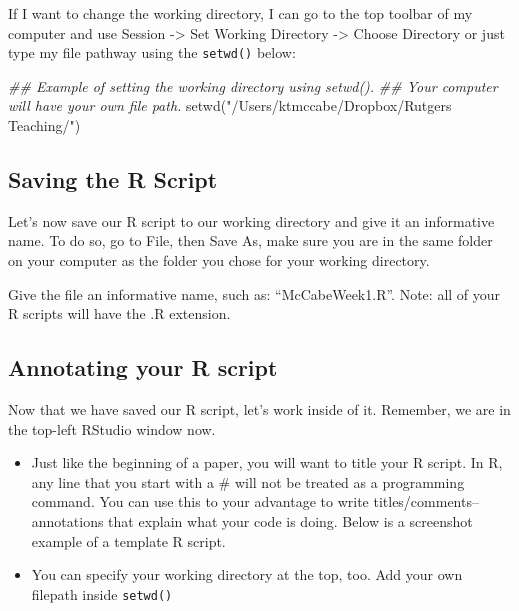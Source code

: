 \documentclass[
  letterpaper,
  DIV=11,
  numbers=noendperiod]{scrreprt}
\newenvironment{Shaded}{\begin{snugshade}}{\end{snugshade}}
\newcommand{\DocumentationTok}[1]{\textcolor[rgb]{0.37,0.37,0.37}{\textit{#1}}}
\newcommand{\FunctionTok}[1]{\textcolor[rgb]{0.28,0.35,0.67}{#1}}
\newcommand{\NormalTok}[1]{\textcolor[rgb]{0.00,0.23,0.31}{#1}}
\newcommand{\StringTok}[1]{\textcolor[rgb]{0.13,0.47,0.30}{#1}}
\providecommand{\tightlist}{%
  \setlength{\itemsep}{0pt}\setlength{\parskip}{0pt}}\usepackage{longtable,booktabs,array}
\begin{document}
If I want to change the working directory, I can go to the top toolbar
of my computer and use Session -\textgreater{} Set Working Directory
-\textgreater{} Choose Directory or just type my file pathway using the
\texttt{setwd()} below:

\begin{Shaded}
\begin{Highlighting}[]
\DocumentationTok{\#\# Example of setting the working directory using setwd().}
\DocumentationTok{\#\# Your computer will have your own file path.}
\FunctionTok{setwd}\NormalTok{(}\StringTok{"/Users/ktmccabe/Dropbox/Rutgers Teaching/"}\NormalTok{)}
\end{Highlighting}
\end{Shaded}

\hypertarget{saving-the-r-script}{%
\subsection{Saving the R Script}\label{saving-the-r-script}}

Let's now save our R script to our working directory and give it an
informative name. To do so, go to File, then Save As, make sure you are
in the same folder on your computer as the folder you chose for your
working directory.

Give the file an informative name, such as: ``McCabeWeek1.R''. Note: all
of your R scripts will have the .R extension.

\hypertarget{annotating-your-r-script}{%
\subsection{Annotating your R script}\label{annotating-your-r-script}}

Now that we have saved our R script, let's work inside of it. Remember,
we are in the top-left RStudio window now.

\begin{itemize}
\tightlist
\item
  Just like the beginning of a paper, you will want to title your R
  script. In R, any line that you start with a \# will not be treated as
  a programming command. You can use this to your advantage to write
  titles/comments-- annotations that explain what your code is doing.
  Below is a screenshot example of a template R script.
\item
  You can specify your working directory at the top, too. Add your own
  filepath inside \texttt{setwd()}
\end{itemize}
\end{document}
